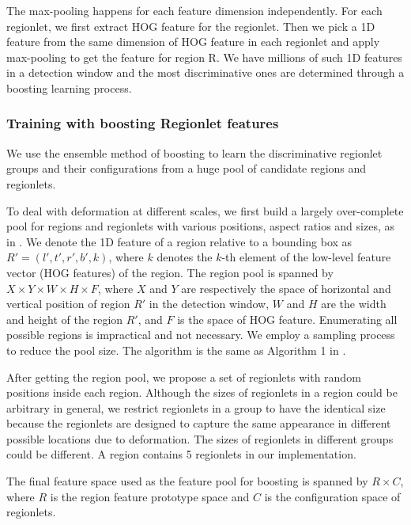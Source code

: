 \documentclass{article} %
\begin{document}
The max-pooling happens for each feature dimension independently. For each regionlet, we first extract HOG feature for the regionlet. Then we pick a 1D feature from the same dimension of HOG feature in each regionlet and apply max-pooling to get the feature for region R. We have millions of such 1D features in a detection window and the most discriminative ones are determined through a boosting learning process.

\subsubsection{Training with boosting Regionlet features}
\label{training_regionlets}

We use the ensemble method of boosting to learn the discriminative regionlet groups and their configurations from a huge pool of candidate regions and regionlets.

To deal with deformation at different scales, we first build a largely over-complete pool for regions and regionlets with various positions, aspect ratios and sizes, as in \cite{Wang2013}. 
We denote the 1D feature of a region relative to a bounding box as $R'= (l', t', r', b', k)$, where $k$ denotes the $k$-th element of the low-level feature vector (HOG features) of the region. The region pool is spanned by $X \times Y \times W \times H \times F$, where $X$ and $Y$ are respectively the space of horizontal and vertical position of region $R'$ in the detection window, $W$ and $H$ are the width and height of the region $R'$, and $F$ is the space of HOG feature. Enumerating all possible regions is impractical and not necessary. We employ a sampling process to reduce the pool size. The algorithm is the same as Algorithm 1 in \cite{Wang2013}.

After getting the region pool, we propose a set of regionlets with random positions inside each region. Although the sizes of regionlets in a region could be arbitrary in general, we restrict regionlets in a group to have the identical size because the regionlets are designed to capture the same appearance in different possible locations due to deformation\cite{Wang2013}. The sizes of regionlets in different groups could be different. A region contains 5 regionlets in our implementation.

The final feature space used as the feature pool for boosting is spanned by $R \times C$, where $R$ is the region feature prototype space and $C$ is the configuration space of regionlets.
\end{document}
